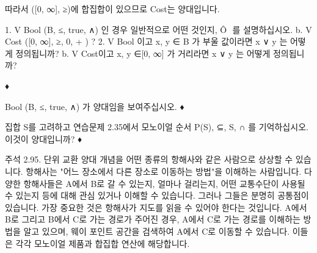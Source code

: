 \documentclass[11pt, a4paper, twoside, openany]{book}
\begin{document}
{\par\medskip
따라서 ([0, ∞], ≥)에 합집합이 있으므로 Cost\hspace{0pt}는 양대입니다.

\par\medskip
\begin{exercisebox}[연습문제 2.92.]
1. V  Bool  (B, ≤, true, ∧) 인 경우 일반적으로 어떤 것인지, Ô  를 설명하십시오.
b. V  Cost  ([0, ∞], ≥, 0, + ) ?
2. V  Bool 이고 x, y ∈ B 가 부울 값이라면 x ∨ y 는 어떻게 정의됩니까?
b. V  Cost\hspace{0pt}이고 x, y ∈[0, ∞] 가 거리라면 x ∨ y 는 어떻게 정의됩니까?
\end{exercisebox}

\par\medskip
♦

\par\medskip
\begin{exercisebox}[연습문제 2.93.]
Bool  (B, ≤, true, ∧) 가 양대임을 보여주십시오.
♦
\end{exercisebox}

\par\medskip
\begin{exercisebox}[연습문제 2.94.]
집합 S\hspace{0pt}를 고려하고 연습문제 2.35\hspace{0pt}에서 모노이얼 순서 P(S), ⊆, S, ∩ 를 기억하십시오. 이것이 양대입니까?
♦
\end{exercisebox}

\par\medskip
주석 2.95. 단위 교환 양대 개념을 어떤 종류의 항해사와 같은 사람으로 상상할 수 있습니다. 항해사는 "어느 장소에서 다른 장소로 이동하는 방법"을 이해하는 사람입니다. 다양한 항해사들은 A\hspace{0pt}에서 B\hspace{0pt}로 갈 수 있는지, 얼마나 걸리는지, 어떤 교통수단이 사용될 수 있는지 등에 대해 관심 있거나 이해할 수 있습니다. 그러나 그들은 분명히 공통점이 있습니다. 가장 중요한 것은 항해사가 지도를 읽을 수 있어야 한다는 것입니다. A\hspace{0pt}에서 B\hspace{0pt}로 그리고 B\hspace{0pt}에서 C\hspace{0pt}로 가는 경로가 주어진 경우, A\hspace{0pt}에서 C\hspace{0pt}로 가는 경로를 이해하는 방법을 알고 있으며, 웨이 포인트 공간을 검색하여 A\hspace{0pt}에서 C\hspace{0pt}로 이동할 수 있습니다. 이들은 각각 모노이얼 제품과 합집합 연산에 해당합니다.

}
\end{document}
